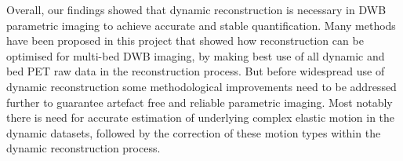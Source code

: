 Overall, our findings showed that dynamic reconstruction is necessary in DWB parametric imaging to achieve accurate and stable quantification. Many methods have been proposed in this project that showed how reconstruction can be optimised for multi-bed DWB imaging, by making best use of all dynamic and bed PET raw data in the reconstruction process. But before widespread use of dynamic reconstruction some methodological improvements need to be addressed further to guarantee artefact free and reliable parametric imaging. Most notably there is need for accurate estimation of underlying complex elastic motion in the dynamic datasets, followed by the correction of these motion types within the dynamic reconstruction process.

